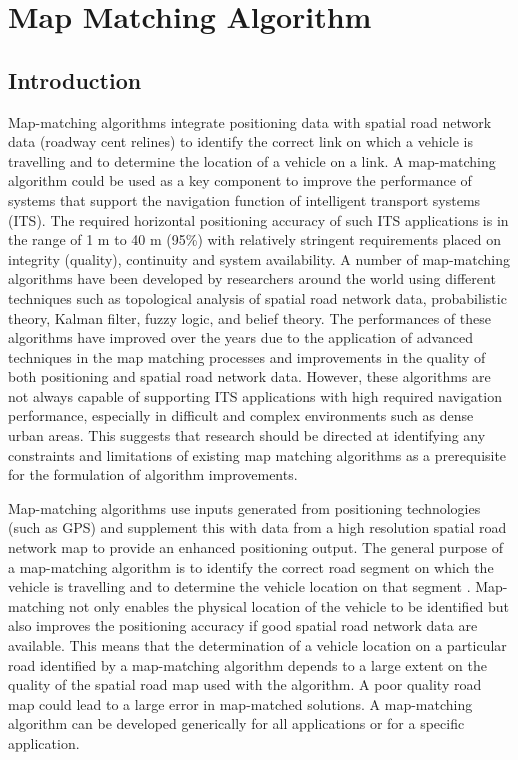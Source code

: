 \section{Map Matching Algorithm}
\subsection{Introduction}
\hspace{2cm} Map-matching algorithms integrate positioning data with spatial road network data (roadway cent relines) to identify  the correct link on which a vehicle is travelling and to determine the location of a vehicle on a link. A map-matching algorithm could be used as a key component to improve the performance of systems that support the navigation function of  intelligent transport systems (ITS). The required horizontal positioning accuracy of such ITS applications is in the range of  1 m to 40 m (95\%) with relatively stringent requirements placed on integrity (quality), continuity and system availability. A  number of map-matching algorithms have been developed by researchers around the world using different techniques such  as topological analysis of spatial road network data, probabilistic theory, Kalman filter, fuzzy logic, and belief theory. The  performances of these algorithms have improved over the years due to the application of advanced techniques in the map  matching processes and improvements in the quality of both positioning and spatial road network data. However, these  algorithms are not always capable of supporting ITS applications with high required navigation performance, especially in  difficult and complex environments such as dense urban areas. This suggests that research should be directed at identifying  any constraints and limitations of existing map matching algorithms as a prerequisite for the formulation of algorithm  improvements.

Map-matching algorithms use inputs generated from positioning technologies (such as GPS) and supplement this with data from a high resolution spatial road network map to provide an enhanced positioning output. The general purpose of a map-matching algorithm is to identify the correct road segment on which the vehicle is travelling and to determine the vehicle location on that segment . Map-matching not only enables the physical location of the vehicle to be identified but also improves the positioning accuracy if good spatial road network data are available. This means that the determination of a vehicle location on a particular road identified by a map-matching algorithm depends to a large extent on the quality of the spatial road map used with the algorithm. A poor
quality road map could lead to a large error in map-matched solutions.
A map-matching algorithm can be developed generically for all applications or for a specific application.\cite{map-matching}

